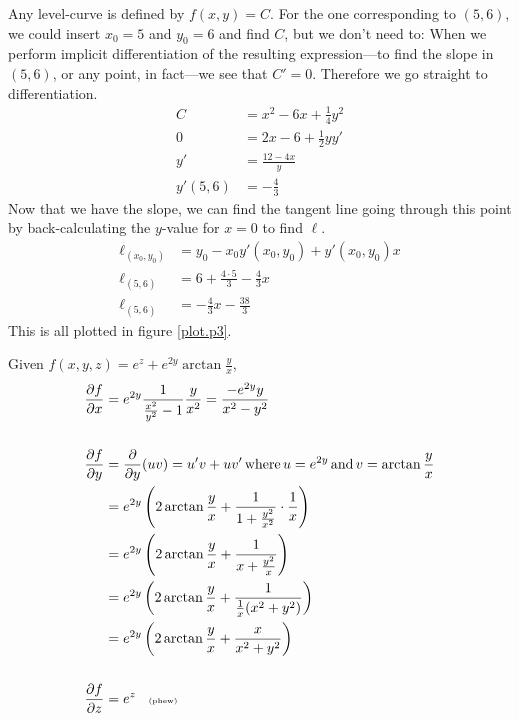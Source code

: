 \documentclass[a4paper,norsk,12pt]{article}
\begin{document}
Any level-curve is defined by $f(x,y)=C$. For the one corresponding to $(5,6)$,
we could insert $x_0=5$ and $y_0=6$ and find $C$, but we don't need to: When we
perform implicit differentiation of the resulting expression---to find the
slope in $(5,6)$, or any point, in fact---we see that $C'=0$. Therefore we go
straight to differentiation.
\begin{align*}
  C &= x^2 - 6x + \frac{1}{4}y^2 \\
  0 &= 2x - 6 + \frac{1}{2}yy' \\
  y' &= \frac{12-4x}{y} \\
  y'(5,6) &= -\frac{4}{3}
\end{align*}
Now that we have the slope, we can find the tangent line going through this
point by back-calculating the $y$-value for $x=0$ to find $\ell$.
\begin{align*}
  \ell_{(x_0, y_0)} &= y_0 - x_0y'(x_0,y_0) + y'(x_0,y_0)x \\
  \ell_{(5,6)} &= 6+\frac{4\cdot5}{3} -\frac{4}{3}x \\
  \ell_{(5,6)} &= -\frac{4}{3}x -\frac{38}{3}
\end{align*}
This is all plotted in figure \vref{plot.p3}.

Given $f(x,y,z) = e^z + e^{2y}\arctan{\frac{y}{x}}$,
\begin{align*}
  \frac{\partial f}{\partial x} &=
    e^{2y}\frac{1}{\frac{x^2}{y^2}-1}\frac{y}{x^2} = \frac{-e^{2y}y}{x^2-y^2} \\
    \\
    \frac{\partial f}{\partial y} &= \frac{\partial}{\partial y}(uv) =
    u'v+uv' \,\text{where}\, u=e^{2y} \,\text{and}\, v=\arctan{\frac{y}{x}} \\
    &= e^{2y}\left( 2\arctan{\frac{y}{x}} + \frac{1}{1+\frac{y^2}{x^2}}\cdot\frac{1}{x}\right) \\
    &= e^{2y}\left( 2\arctan{\frac{y}{x}} + \frac{1}{x+\frac{y^2}{x}}\right) \\
    &= e^{2y}\left( 2\arctan{\frac{y}{x}} + \frac{1}{\frac{1}{x}(x^2+y^2)}\right) \\
    &= e^{2y}\left( 2\arctan{\frac{y}{x}} + \frac{x}{x^2+y^2} \right) \\
    \\
    \frac{\partial f}{\partial z} &= e^z \>\>\>\>\text{\tiny{(phew)}}
\end{align*}
\end{document}
